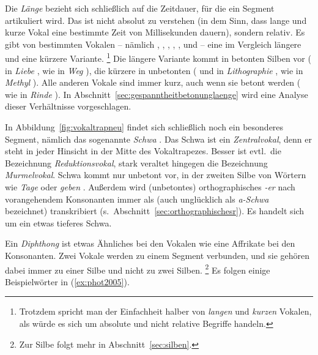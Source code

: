Die \textit{Länge} bezieht sich schließlich auf die Zeitdauer, für die ein Segment artikuliert wird.
Das ist nicht absolut zu verstehen (in dem Sinn, dass lange und kurze Vokal eine bestimmte Zeit von Millisekunden dauern), sondern relativ.
Es gibt von bestimmten Vokalen -- nämlich \textipa{[i]}, \textipa{[y]}, \textipa{[u]}, \textipa{[e]}, \textipa{[\o]}, \textipa{[o]} und \textipa{[a]} -- eine im Vergleich längere und eine kürzere Variante.%
\footnote{Trotzdem spricht man der Einfachheit halber von \textit{langen} und \textit{kurzen} Vokalen, als würde es sich um absolute und nicht relative Begriffe handeln.}
Die längere Variante kommt in betonten Silben vor (\textipa{[i:]} in \textit{Liebe} \textipa{[li:b@]}, \textipa{[e:]} wie in \textit{Weg} \textipa{[ve:k]}), die kürzere in unbetonten (\textipa{[i]} und \textipa{[o]} in \textit{Lithographie} \textipa{[litogKafi:]}, \textipa{[e]} wie in \textit{Methyl} \mbox{\textipa{[mety:l]}}).
Alle anderen Vokale sind immer kurz, auch wenn sie betont werden (\textipa{[I]} wie in \textit{Rinde} \textipa{[KInd@]}).
In Abschnitt~\ref{sec:gespanntheitbetonunglaenge} wird eine Analyse dieser Verhältnisse vorgeschlagen.

In Abbildung~\ref{fig:vokaltrapneu} findet sich schließlich noch ein besonderes Segment, nämlich das sogenannte \textit{Schwa} \textipa{[@]}.
Das Schwa ist ein \textit{Zentralvokal}, denn er steht in jeder Hinsicht in der Mitte des Vokaltrapezes.
Besser ist evtl.\ die Bezeichnung \textit{Reduktionsvokal}, stark veraltet hingegen die Bezeichnung \textit{Murmelvokal}.
Schwa kommt nur unbetont vor, \zB in der zweiten Silbe von Wörtern wie \textit{Tage} \textipa{[ta:g@]} oder \textit{geben} \textipa{[ge:b@n]}.
Außerdem wird (unbetontes) orthographisches \textit{-er} nach vorangehendem Konsonanten immer als \textipa{[5]} (auch unglücklich als \textit{a-Schwa} bezeichnet) transkribiert (s.\ Abschnitt~\ref{sec:orthographischesr}).
Es handelt sich um ein etwas tieferes Schwa.

Ein \textit{Diphthong} ist etwas Ähnliches bei den Vokalen wie eine Affrikate bei den Konsonanten.
Zwei Vokale werden zu einem Segment verbunden, und sie gehören dabei immer zu einer Silbe und nicht zu zwei Silben.%
\footnote{Zur Silbe folgt mehr in Abschnitt~\ref{sec:silben}.}
Es folgen einige Beispielwörter in (\ref{ex:phot2005}).

\Enl

\begin{exe}
  \ex\label{ex:phot2005}
  \begin{xlist}
  \end{xlist}
\end{exe}

